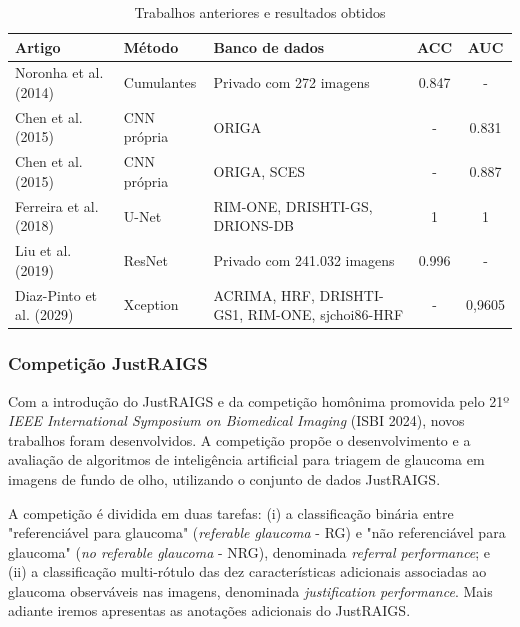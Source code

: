 \documentclass[12pt]{article}
\begin{document}
\begin{table}[htb]
    \centering
    \begin{tabular}{|l|l|p{3cm}|c|c|}
    \hline
    \textbf{Artigo} & \textbf{Método} & \textbf{Banco de dados} & \textbf{ACC} & \textbf{AUC} \\
    \hline
    Noronha et al. (2014)~\cite{noronha2014hoc} & Cumulantes  & Privado com 272 imagens        & 0.847 &  -    \\
    \hline
    Chen et al. (2015)~\cite{chen2015cnn}       & CNN própria & ORIGA                          & -     & 0.831 \\
    \hline
    Chen et al. (2015)~\cite{chen2015cnn}       & CNN própria & ORIGA, SCES                    & -     & 0.887 \\
    \hline
    Ferreira et al. (2018)~\cite{ferreira_cnn_2018} & U-Net   & RIM-ONE, DRISHTI-GS, DRIONS-DB & 1     & 1     \\
    \hline
    Liu et al. (2019)~\cite{liu_cnn_2019}       & ResNet      & Privado com 241.032 imagens    & 0.996 & -     \\
    \hline
    Diaz-Pinto et al. (2029)~\cite{liu_cnn_2019} & Xception & ACRIMA, HRF, DRISHTI-GS1, RIM-ONE, sjchoi86-HRF & - & 0,9605 \\
    \hline
    \end{tabular}
    \caption{Trabalhos anteriores e resultados obtidos}
    \label{tab:trabalhos}
\end{table}

\subsubsection{Competição JustRAIGS}
\label{sec:review:related:justraigs}

Com a introdução do JustRAIGS e da competição homônima promovida pelo 21º \textit{IEEE International Symposium on Biomedical Imaging} (ISBI 2024), novos trabalhos foram desenvolvidos. A competição propõe o desenvolvimento e a avaliação de algoritmos de inteligência artificial para triagem de glaucoma em imagens de fundo de olho, utilizando o conjunto de dados JustRAIGS.

A competição é dividida em duas tarefas: (i) a classificação binária entre "referenciável para glaucoma" (\textit{referable glaucoma} - RG) e "não referenciável para glaucoma" (\textit{no referable glaucoma} -  NRG), denominada \textit{referral performance}; e (ii) a classificação multi-rótulo das dez características adicionais associadas ao glaucoma observáveis nas imagens, denominada \textit{justification performance}. Mais adiante iremos apresentas as anotações adicionais do JustRAIGS.
\end{document}
